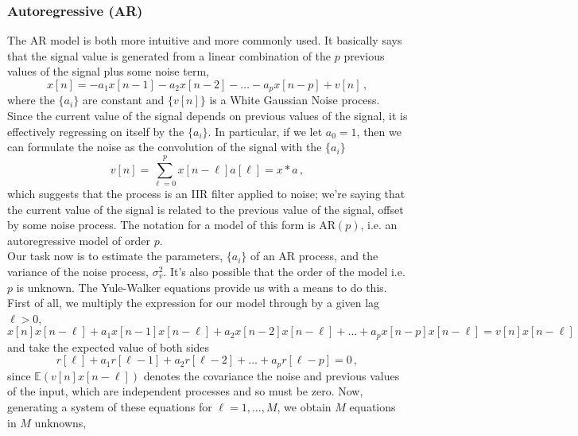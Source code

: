 \subsubsection{Autoregressive (AR)}
%
The AR model is both more intuitive and more commonly used. It basically
says that the signal value is generated from a linear combination of the
$p$ previous values of the signal plus some noise term,
%
\begin{displaymath}
  x[n] = -a_1x[n-1] - a_2x[n-2] - \hdots - a_px[n-p] + v[n] \,,
\end{displaymath}
%
where the $\{a_i\}$ are constant and $\{v[n]\}$ is a White Gaussian Noise
process. Since the current value of the signal depends on previous values
of the signal, it is effectively regressing on itself by the $\{a_i\}$.
In particular, if we let $a_0 = 1$, then we can formulate the noise
as the convolution of the signal with the $\{a_i\}$
%
\begin{displaymath}
  v[n] = \sum_{\ell=0}^p x[n-\ell]a[\ell] = x * a \,,
\end{displaymath}
%
which suggests that the process is an IIR filter applied to noise; we're
saying that the current value of the signal is related to the previous
value of the signal, offset by some noise process.
The notation for a model of this form is AR$(p)$, i.e. an autoregressive 
model of order $p$.\\
%
Our task now is to estimate the parameters, $\{a_i\}$ of an AR process,
and the variance of the noise process, $\sigma^2_v$. It's also possible
that the order of the model i.e. $p$ is unknown. The Yule-Walker
equations provide us with a means to do this. First of all, we multiply
the expression for our model through by a given lag $\ell > 0$,
%
\begin{displaymath}
  x[n]x[n-\ell] + a_1x[n-1]x[n-\ell] + a_2x[n-2]x[n-\ell] + \hdots
  + a_px[n-p]x[n-\ell] = v[n]x[n-\ell] 
\end{displaymath}
%
and take the expected value of both sides
%
\begin{displaymath}
  r[\ell] + a_1r[\ell-1] + a_2r[\ell - 2] + \hdots + a_pr[\ell - p]
  = 0 \,,
\end{displaymath}
%
since $\mathbb{E}(v[n]x[n-\ell])$ denotes the covariance the noise
and previous values of the input, which are independent processes
and so must be zero. Now, generating a system of these equations
for $\ell = 1,\hdots,M$, we obtain $M$ equations in $M$ unknowns,
%
